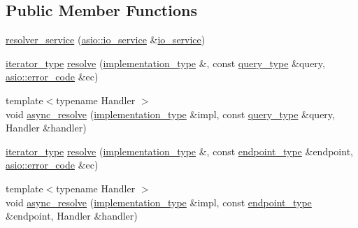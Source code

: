 \subsection*{Public Member Functions}
\begin{DoxyCompactItemize}
\item 
\hyperlink{classasio_1_1detail_1_1resolver__service_aef337d9c98b3ad63e5c292b00ab3d84e}{resolver\+\_\+service} (\hyperlink{classasio_1_1io__service}{asio\+::io\+\_\+service} \&\hyperlink{classasio_1_1io__service}{io\+\_\+service})
\item 
\hyperlink{classasio_1_1detail_1_1resolver__service_ab9c188c775855b13d06f6682014cbf55}{iterator\+\_\+type} \hyperlink{classasio_1_1detail_1_1resolver__service_a197fe2a6278cd25cc8a7f2a0f0163e5e}{resolve} (\hyperlink{classasio_1_1detail_1_1resolver__service_a9b39aff4ee39b0f45731ec01d9f5fd74}{implementation\+\_\+type} \&, const \hyperlink{classasio_1_1detail_1_1resolver__service_a3200fbe0279811d68ebacc1bd28d4418}{query\+\_\+type} \&query, \hyperlink{classasio_1_1error__code}{asio\+::error\+\_\+code} \&ec)
\item 
{\footnotesize template$<$typename Handler $>$ }\\void \hyperlink{classasio_1_1detail_1_1resolver__service_af612b0840b67b8be0e2cbbc96ba31033}{async\+\_\+resolve} (\hyperlink{classasio_1_1detail_1_1resolver__service_a9b39aff4ee39b0f45731ec01d9f5fd74}{implementation\+\_\+type} \&impl, const \hyperlink{classasio_1_1detail_1_1resolver__service_a3200fbe0279811d68ebacc1bd28d4418}{query\+\_\+type} \&query, Handler \&handler)
\item 
\hyperlink{classasio_1_1detail_1_1resolver__service_ab9c188c775855b13d06f6682014cbf55}{iterator\+\_\+type} \hyperlink{classasio_1_1detail_1_1resolver__service_a6f842d114dbda4ee9ec0f199290b9b88}{resolve} (\hyperlink{classasio_1_1detail_1_1resolver__service_a9b39aff4ee39b0f45731ec01d9f5fd74}{implementation\+\_\+type} \&, const \hyperlink{classasio_1_1detail_1_1resolver__service_a4c9bdef1b2990355b5e02df3056554df}{endpoint\+\_\+type} \&endpoint, \hyperlink{classasio_1_1error__code}{asio\+::error\+\_\+code} \&ec)
\item 
{\footnotesize template$<$typename Handler $>$ }\\void \hyperlink{classasio_1_1detail_1_1resolver__service_a0fa26edd737c7f42801631d69bc07acb}{async\+\_\+resolve} (\hyperlink{classasio_1_1detail_1_1resolver__service_a9b39aff4ee39b0f45731ec01d9f5fd74}{implementation\+\_\+type} \&impl, const \hyperlink{classasio_1_1detail_1_1resolver__service_a4c9bdef1b2990355b5e02df3056554df}{endpoint\+\_\+type} \&endpoint, Handler \&handler)
\end{DoxyCompactItemize}
